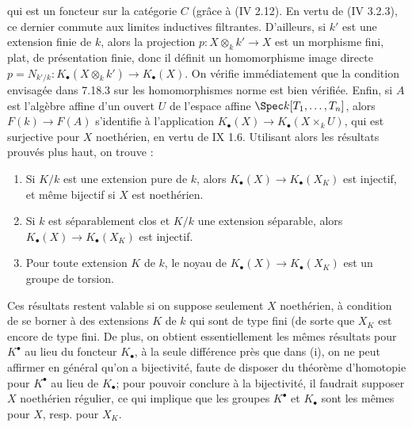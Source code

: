 
qui est un
foncteur sur la catégorie \(C\) (grâce à (IV 2.12). En vertu de (IV 3.2.3), ce dernier commute aux limites inductives filtrantes. D'ailleurs, si \(k'\) est une extension finie de \(k\), alors la projection \(p:X\otimes_k k'\to X\) est un morphisme fini, plat, de présentation finie, donc il définit un homomorphisme image directe \(p=N_{k'/k}:K_\bullet(X\otimes_k k')\longrightarrow K_\bullet(X)\). On vérifie immédiatement que la condition envisagée dans 7.18.3 sur les homomorphismes norme est bien vérifiée. Enfin, si \(A\) est l'algèbre affine d'un ouvert \(U\) de l'espace affine \(\Spec k[T_1,\ldots,T_n]\), alors \(F(k)\to F(A)\) s'identifie à l'application \(K_\bullet(X)\longrightarrow K_\bullet(X\times_k U)\), qui est surjective pour \(X\) noethérien, en vertu de IX 1.6. Utilisant alors les résultats prouvés plus haut, on trouve :
\begin{enumerate}[label=(\roman*)]
\item Si \(K/k\) est une extension pure de \(k\), alors \(K_\bullet(X)\longrightarrow K_\bullet(X_K)\) est injectif, et même bijectif si \(X\) est noethérien.
\item Si \(k\) est séparablement clos et \(K/k\) une extension séparable, alors \(K_\bullet(X)\longrightarrow K_\bullet(X_K)\) est injectif.
\item Pour toute extension \(K\) de \(k\), le noyau de \(K_\bullet(X)\longrightarrow K_\bullet(X_K)\) est un groupe de torsion.
\end{enumerate}
Ces résultats restent valable si on suppose seulement \(X\) noethérien, à condition de se borner à des extensions \(K\) de \(k\) qui sont de type fini (de sorte que \(X_K\) est encore de type fini. De plus, on obtient essentiellement les mêmes résultats pour \(K^\bullet\) au lieu du foncteur \(K_\bullet\), à la seule différence près que dans (i), on ne peut affirmer en général qu'on a bijectivité, faute de disposer du théorème d'homotopie pour \(K^\bullet\) au lieu de \(K_\bullet\); pour pouvoir conclure à la bijectivité, il faudrait supposer \(X\) noethérien régulier, ce qui implique que les groupes \(K^\bullet\) et \(K_\bullet\) sont les mêmes pour \(X\), resp. pour \(X_K\).

